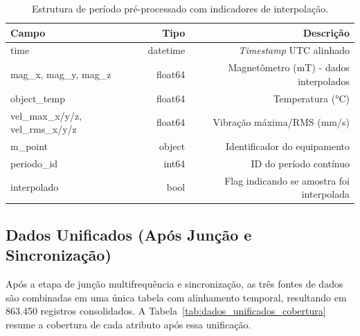 \begin{table}[H]
  \centering
  \small
  \begin{tabular}{|l|r|r|}
    \hline
    \textbf{Campo}                   & \textbf{Tipo} & \textbf{Descrição}                        \\
    \hline
    time                             & datetime      & \textit{Timestamp} UTC alinhado           \\
    mag\_x, mag\_y, mag\_z           & float64       & Magnetômetro (mT) - dados interpolados    \\
    object\_temp                     & float64       & Temperatura (°C)                          \\
    vel\_max\_x/y/z, vel\_rms\_x/y/z & float64       & Vibração máxima/RMS (mm/s)                \\
    m\_point                         & object        & Identificador do equipamento              \\
    periodo\_id                      & int64         & ID do período contínuo                    \\
    interpolado                      & bool          & Flag indicando se amostra foi interpolada \\
    \hline
  \end{tabular}
  \caption{Estrutura de período pré-processado com indicadores de interpolação.}
  \label{tab:dados_periodo_preprocessado}
\end{table}

\subsection{Dados Unificados (Após Junção e Sincronização)}

Após a etapa de junção multifrequência e sincronização, as três fontes de dados são combinadas em uma única tabela com alinhamento temporal, resultando em 863.450 registros consolidados. A Tabela~\ref{tab:dados_unificados_cobertura} resume a cobertura de cada atributo após essa unificação.

